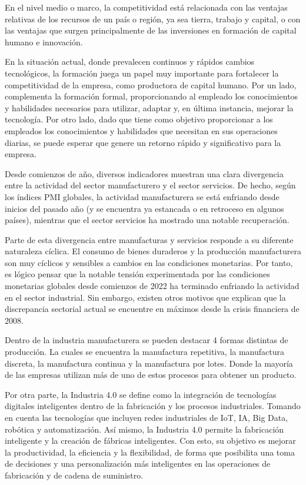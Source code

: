         En el nivel medio o marco, la competitividad está relacionada con las ventajas relativas de los recursos de un país o región, ya sea tierra, trabajo y capital, o con las ventajas que surgen principalmente de las inversiones en formación de capital humano e innovación. \cite{padilla2006instrumento}
        
        En la situación actual, donde prevalecen continuos y rápidos cambios tecnológicos, la formación juega un papel muy importante para fortalecer la competitividad de la empresa, como productora de capital humano. Por un lado, complementa la formación formal, proporcionando al empleado los conocimientos y habilidades necesarios para utilizar, adaptar y, en última instancia, mejorar la tecnología. Por otro lado, dado que tiene como objetivo proporcionar a los empleados los conocimientos y habilidades que necesitan en sus operaciones diarias, se puede esperar que genere un retorno rápido y significativo para la empresa.\cite{casar1993competitividad}
        
        Desde comienzos de año, diversos indicadores muestran una clara divergencia entre la actividad del sector manufacturero y el sector servicios. De hecho, según los índices PMI globales, la actividad manufacturera se está enfriando desde inicios del pasado año (y se encuentra ya estancada o en retroceso en algunos países), mientras que el sector servicios ha mostrado una notable recuperación.
        
        Parte de esta divergencia entre manufacturas y servicios responde a su diferente naturaleza cíclica. El consumo de bienes duraderos y la producción manufacturera son muy cíclicos y sensibles a cambios en las condiciones monetarias. Por tanto, es lógico pensar que la notable tensión experimentada por las condiciones monetarias globales desde comienzos de 2022 ha terminado enfriando la actividad en el sector industrial. Sin embargo, existen otros motivos que explican que la discrepancia sectorial actual se encuentre en máximos desde la crisis financiera de 2008. \cite{CaixaBank}
    
        Dentro de la industria manufacturera se pueden destacar 4 formas distintas de producción. La cuales se encuentra la manufactura repetitiva, la manufactura discreta, la manufactura continua y la manufactura por lotes. Donde la mayoría de las empresas utilizan más de uno de estos procesos para obtener un producto. \cite{JavierA}
        
        Por otra parte, la Industria 4.0 se define como la integración de tecnologías digitales inteligentes dentro de la fabricación y los procesos industriales. Tomando en cuenta las tecnologías que incluyen redes industriales de IoT, IA, Big Data, robótica y automatización. Así mismo, la Industria 4.0 permite la fabricación inteligente y la creación de fábricas inteligentes. Con esto, su objetivo es mejorar la productividad, la eficiencia y la flexibilidad, de forma que posibilita una toma de decisiones y una personalización más inteligentes en las operaciones de fabricación y de cadena de suministro. \cite{SAP}
    
